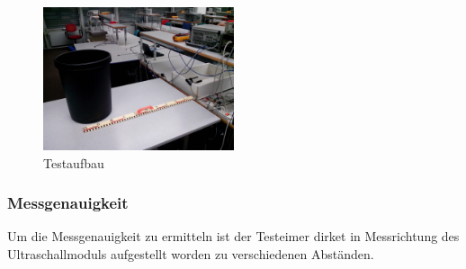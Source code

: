 \begin{figure}[h!]
	\centering
		\includegraphics[width=0.5\textwidth]{../../fig/HC-SR04_01.jpg}
	\caption{Testaufbau}
	\label{fig:testaufbau_hcsr04}
\end{figure}

\subsubsection{Messgenauigkeit}
Um die Messgenauigkeit zu ermitteln ist der Testeimer dirket in Messrichtung
des Ultraschallmoduls aufgestellt worden zu verschiedenen Abständen.

